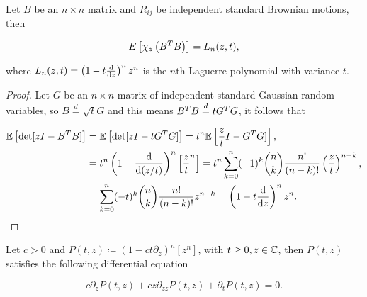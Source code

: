 \begin{theorem}
    Let $B$ be an $n\times n$ matrix and $R_{ij}$ be independent standard Brownian motions, then 

    \begin{equation*}
        E\left[ \chi_z\left( B^TB\right) \right] = L_n(z,t),
    \end{equation*}

    \noindent where $L_n(z,t) = \left( 1 - t\frac{\mathrm d}{\mathrm d z} \right)^n z^n$ is the $n$th Laguerre polynomial with variance $t$.
\end{theorem}

\begin{proof}
    Let $G$ be an $n\times n$ matrix of independent standard Gaussian random variables, so $B \overset{d}{=} \sqrt{t}G$ and this means $B^TB \overset{d}{=} t G^T G$, it follows that

    \begin{align*}
        \mathbb E \left[ \det[zI - B^T B] \right] &= \mathbb E \left[ \det[zI - t G^T G] \right] = t^n \mathbb E \left[ \frac zt I - G^TG] \right], \\
        &= t^n \left(1 - \frac{\mathrm d }{\mathrm d (z/t)}\right)^n\left[ \frac{z}{t}^n\right] = t^n\sum_{k=0}^n (-1)^k \binom nk \frac{n!}{(n-k)!} \left(\frac zt\right)^{n-k},\\
        &= \sum_{k=0}^n (-t)^k \binom nk \frac{n!}{(n-k)!} z^{n-k} = \left( 1 - t\frac{\mathrm d}{\mathrm d z} \right)^n z^n.
    \end{align*}
\end{proof}


\begin{theorem}
    Let $c>0$ and $P(t,z) \coloneqq \left( 1 - ct\partial_z \right)^n [z^n]$, with $t\ge 0, z \in \mathbb C$, then $P(t,z)$ satisfies the following differential equation

    \begin{equation*} 
        c\partial_z P(t,z) + cz  \partial_{zz}P(t,z) + \partial_t P(t,z) = 0.
     \end{equation*}

\end{theorem}

